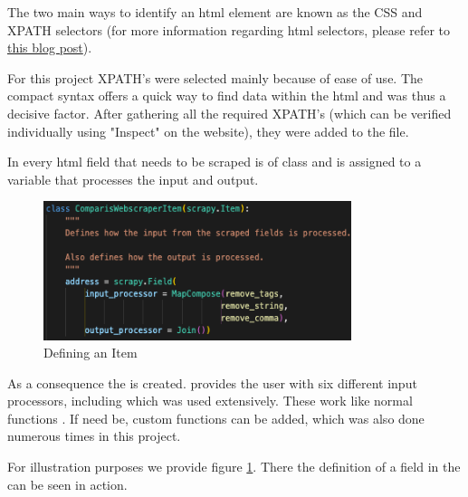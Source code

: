 \documentclass[main]{subfiles}
\begin{document}
The two main ways to identify an \acs*{html} element are known as the CSS and XPATH selectors 
(for more information regarding \acs*{html} selectors, please refer to 
\href{https://medium.com/geekculture/how-to-parse-a-webpage-using-selectors-scraping-with-dfb3894cff58}{this blog post}).

For this project XPATH's were selected mainly because of ease of use.
The compact syntax offers a quick way to find data within the \acs*{html} and was thus a decisive factor.
After gathering all the required XPATH's (which can be verified individually using "Inspect" on the website), 
they were added to the \pkg[items.py] file.

In \pkg[items.py] every \acs*{html} field that needs to be scraped is of class  
and is assigned to a variable that processes the input and output.


\begin{figure}[htbp]
    \centerline{
        \includegraphics[width = 90mm]{prog_5.png}}
    \caption{Defining an Item}
    \label{fig:itemloader}
\end{figure}



As a consequence the \pkg[ItemLoader] is created.
\pkg[Scrapy] provides the user with six different input processors,
including  \pkg[MapCompose()] which was used extensively.
These work like normal functions \cite{sDemystifyingScrapyItem2020}.
If need be, custom functions can be added, which was also done numerous times in this project.

For illustration purposes we provide figure \ref{fig:itemloader}. 
There the definition of a field in the \pkg[ItemLoader] can be seen in action.
\end{document}
